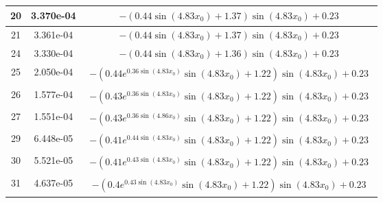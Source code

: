 \begin{center}
\begin{tabular}{|c|c|c|}
\hline20 & 3.370e-04 & $\begin{aligned}- \left(0.44 \sin{\left(4.83 x_{0} \right)} + 1.37\right) \sin{\left(4.83 x_{0} \right)} + 0.23\end{aligned}$\\ \hline21 & 3.361e-04 & $\begin{aligned}- \left(0.44 \sin{\left(4.83 x_{0} \right)} + 1.37\right) \sin{\left(4.83 x_{0} \right)} + 0.23\end{aligned}$\\ \hline24 & 3.330e-04 & $\begin{aligned}- \left(0.44 \sin{\left(4.83 x_{0} \right)} + 1.36\right) \sin{\left(4.83 x_{0} \right)} + 0.23\end{aligned}$\\ \hline25 & 2.050e-04 & $\begin{aligned}- \left(0.44 e^{0.36 \sin{\left(4.83 x_{0} \right)}} \sin{\left(4.83 x_{0} \right)} + 1.22\right) \sin{\left(4.83 x_{0} \right)} + 0.23\end{aligned}$\\ \hline26 & 1.577e-04 & $\begin{aligned}- \left(0.43 e^{0.36 \sin{\left(4.83 x_{0} \right)}} \sin{\left(4.83 x_{0} \right)} + 1.22\right) \sin{\left(4.83 x_{0} \right)} + 0.23\end{aligned}$\\ \hline27 & 1.551e-04 & $\begin{aligned}- \left(0.43 e^{0.36 \sin{\left(4.86 x_{0} \right)}} \sin{\left(4.83 x_{0} \right)} + 1.22\right) \sin{\left(4.83 x_{0} \right)} + 0.23\end{aligned}$\\ \hline29 & 6.448e-05 & $\begin{aligned}- \left(0.41 e^{0.44 \sin{\left(4.83 x_{0} \right)}} \sin{\left(4.83 x_{0} \right)} + 1.22\right) \sin{\left(4.83 x_{0} \right)} + 0.23\end{aligned}$\\ \hline30 & 5.521e-05 & $\begin{aligned}- \left(0.41 e^{0.43 \sin{\left(4.83 x_{0} \right)}} \sin{\left(4.83 x_{0} \right)} + 1.22\right) \sin{\left(4.83 x_{0} \right)} + 0.23\end{aligned}$\\ \hline31 & 4.637e-05 & $\begin{aligned}- \left(0.4 e^{0.43 \sin{\left(4.83 x_{0} \right)}} \sin{\left(4.83 x_{0} \right)} + 1.22\right) \sin{\left(4.83 x_{0} \right)} + 0.23\end{aligned}$\\ \hline\end{tabular}
        \end{center}
        